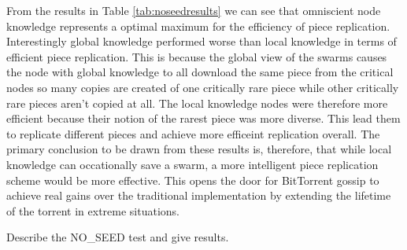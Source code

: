 

From the results in Table \ref{tab:noseedresults} we can see that omniscient node knowledge
represents a optimal maximum for the efficiency of piece
replication. Interestingly global knowledge performed worse than local
knowledge in terms of efficient piece replication. This is because the
global view of the swarms causes the node with global knowledge to all
download the same piece from the critical nodes so many copies are
created of one critically rare piece while other critically rare
pieces aren't copied at all. The local knowledge nodes were therefore
more efficient because their notion of the rarest piece was more
diverse. This lead them to replicate different pieces and achieve more
efficeint replication overall. The primary conclusion to be drawn from
these results is, therefore, that while local knowledge can
occationally save a swarm, a more intelligent piece replication scheme
would be more effective. This opens the door for BitTorrent gossip to
achieve real gains over the traditional implementation by extending
the lifetime of the torrent in extreme situations.

Describe the NO\_SEED test and give results.
